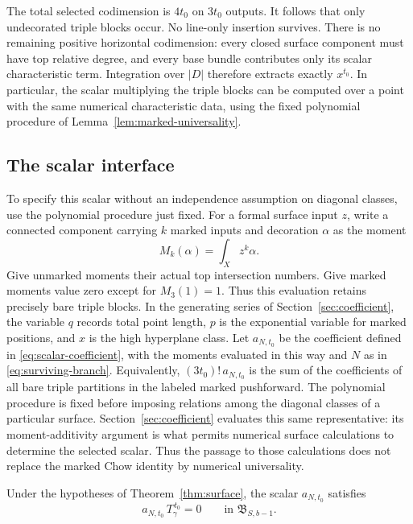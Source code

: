 The total selected codimension is \(4t_0\) on \(3t_0\) outputs.
It follows that only undecorated triple blocks occur.
No line-only insertion survives.
There is no remaining positive horizontal codimension: every closed
surface component must have top relative degree, and every base
bundle contributes only its scalar characteristic term.
Integration over \(|D|\) therefore extracts exactly \(x^{t_0}\).
In particular, the scalar multiplying the triple blocks can be
computed over a point with the same numerical characteristic data,
using the fixed polynomial procedure of
Lemma~\ref{lem:marked-universality}.

\subsection{The scalar interface}

To specify this scalar without an independence assumption on diagonal
classes, use the polynomial procedure just fixed.
For a formal surface input \(z\), write a connected component carrying
\(k\) marked inputs and decoration \(\alpha\) as the moment
\[
 M_k(\alpha)=\int_X z^k\alpha.
\]
Give unmarked moments their actual top intersection numbers.
Give marked moments value zero except for \(M_3(1)=1\).
Thus this evaluation retains precisely bare triple blocks.
In the generating series of Section~\ref{sec:coefficient}, the
variable \(q\) records total point length, \(p\) is the exponential
variable for marked positions, and \(x\) is the high hyperplane class.
Let \(a_{N,t_0}\) be the coefficient defined in
\eqref{eq:scalar-coefficient}, with the moments evaluated in this
way and \(N\) as in \eqref{eq:surviving-branch}.
Equivalently, \((3t_0)!\,a_{N,t_0}\) is the sum of the coefficients
of all bare triple partitions in the labeled marked pushforward.
The polynomial procedure is fixed before imposing relations among
the diagonal classes of a particular surface.  Section~\ref{sec:coefficient}
evaluates this same representative: its moment-additivity argument
is what permits numerical surface calculations to determine the
selected scalar.  Thus the passage to those calculations does not
replace the marked Chow identity by numerical universality.

\begin{proposition}
\label{prop:localization}
Under the hypotheses of Theorem~\ref{thm:surface}, the scalar
\(a_{N,t_0}\) satisfies
\[
 a_{N,t_0}\,T_\gamma^{\,t_0}=0
 \qquad\text{in }\mathfrak B_{S,b-1}.
\]
\end{proposition}

